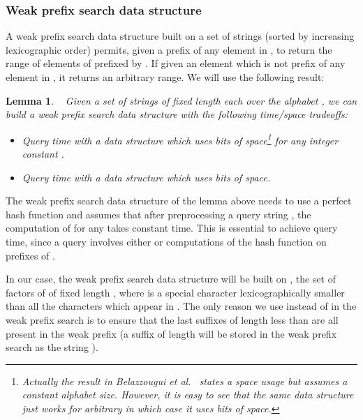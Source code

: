 \documentclass{article}
\newcommand{\?}{\mskip1.5mu}
\newtheorem{lemma}{Lemma}
\begin{document}
\subsubsection{Weak prefix search data structure}
A weak prefix search data structure built on a set of strings  (sorted by increasing lexicographic order) permits, given a prefix  of any element in , to return the range of elements of  prefixed by . If given an element which is not prefix of any element in , it returns an arbitrary range. We will use the following result:
\begin{lemma}~\cite{BBPV10}
\label{lemma:weak_pref_search}
Given a set of  strings of fixed length  each over the alphabet , we can build a weak prefix search data structure with the following time/space tradeoffs:
\begin{itemize}
\item Query time  with a data structure which uses  bits of space\footnote{Actually the result in Belazzougui et al.~\cite{BBPV10} states a space usage  but assumes a constant alphabet size. However, it is easy to see that the same data structure just works for arbitrary  in which case it uses  bits of space.} for any integer constant . 
\item Query time  with a data structure which uses  bits of space. 
\end{itemize}
\end{lemma}
The weak prefix search data structure of the lemma above needs to use a perfect hash function  and assumes that after preprocessing a query string , the computation of  for any  takes constant time. This is essential to achieve  query time, since a query involves either  or  computations of the hash function on prefixes of . 


In our case, the weak prefix search data structure will be built on , the set of factors of  of fixed length , where  is a special character lexicographically smaller than all the characters which appear in . The only reason we use  instead of  in the weak prefix search is to ensure that the last suffixes of length less than  are all present in the weak prefix (a suffix  of length  will be stored in the weak prefix search as the string ).
\end{document}
